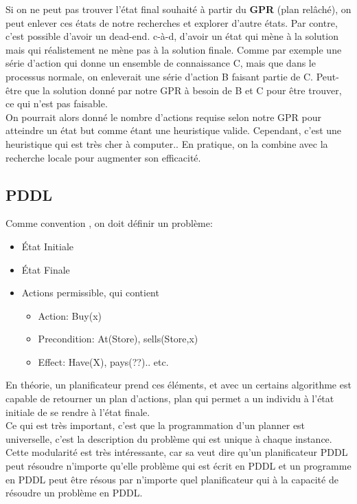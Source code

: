 \documentclass[oneside]{book}
\begin{document}
Si on ne peut pas trouver l'état final souhaité à partir du \textbf{GPR} (plan relâché), on peut enlever ces états de notre recherches et explorer d'autre états. Par contre, c'est possible d'avoir un dead-end. c-à-d, d'avoir un état qui mène à la solution mais qui réalistement ne mène pas à la solution finale. Comme par exemple une série d'action qui donne un ensemble de connaissance C, mais que dans le processus normale, on enleverait une série d'action B faisant partie de C. Peut-être que la solution donné par notre GPR à besoin de B et C pour être trouver, ce qui n'est pas faisable.\\

On pourrait alors donné le nombre d'actions requise selon notre GPR pour atteindre un état but comme étant une heuristique valide. Cependant, c'est une heuristique qui est très cher à computer.. En pratique, on la combine avec la recherche locale pour augmenter son efficacité.

\subsection{PDDL}
Comme convention , on doit définir un problème:
\begin{itemize}
\item État Initiale
\item État Finale
\item Actions permissible, qui contient
\begin{itemize}
\item Action: Buy(x)
\item Precondition: At(Store), sells(Store,x)
\item Effect: Have(X), pays(??).. etc.
\end{itemize}
\end{itemize}

En théorie, un planificateur prend ces éléments, et avec un certains algorithme est capable de retourner un plan d'actions, plan qui permet a un individu à l'état initiale de se rendre à l'état finale.\\

Ce qui est très important, c'est que la programmation d'un planner est universelle, c'est la description du problème qui est unique à chaque instance. Cette modularité est très intéressante, car sa veut dire qu'un planificateur PDDL peut résoudre n'importe qu'elle problème qui est écrit en PDDL et un programme en PDDL peut être résous par n'importe quel planificateur qui à la capacité de résoudre un problème en PDDL.\\
\end{document}
